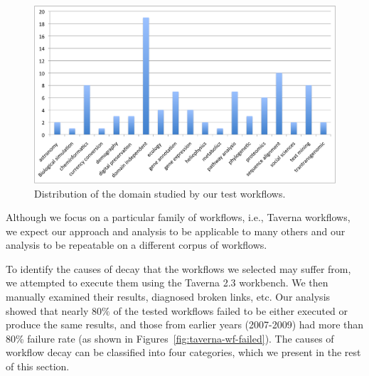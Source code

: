  \begin{figure}[h]
  \begin{center}
    \includegraphics[width=13cm]{./Figures/domain-features.png}
        \caption{Distribution of the domain studied by our test workflows.}
        \label{fig:domain_distribution}
  \end{center}
\end{figure}


Although we focus on a particular family of workflows, i.e., Taverna workflows, we expect our approach and analysis to be applicable to many others and our analysis to be repeatable on a different corpus of workflows. 

To identify the causes of decay that the workflows we selected may suffer from, we attempted to execute them using the Taverna 2.3 workbench. We then manually examined their results, diagnosed broken links, etc. Our analysis showed that nearly $80\%$ of the tested workflows failed to be either executed or produce the same results, and those from earlier years (2007-2009) had more than 80\% failure rate (as shown in Figures~\ref{fig:taverna-wf-failed}). The causes of workflow decay can be classified into four categories, which we present in the rest of this section. 


